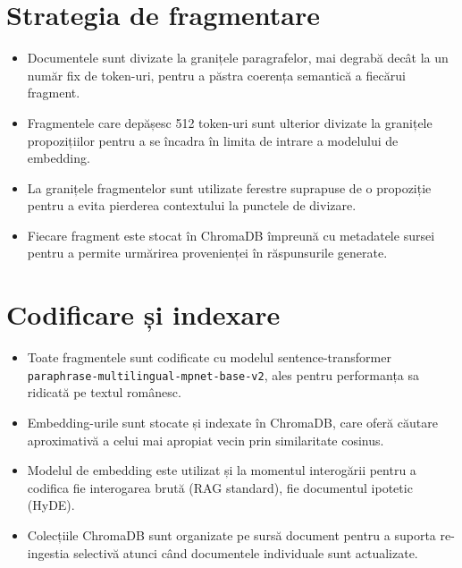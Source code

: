 \documentclass[12pt,a4paper]{report}
\begin{document}
\section{Strategia de fragmentare}
\begin{itemize}
    \item Documentele sunt divizate la granițele paragrafelor, mai degrabă decât la un număr fix de token-uri, pentru a păstra coerența semantică a fiecărui fragment.
    \item Fragmentele care depășesc 512 token-uri sunt ulterior divizate la granițele propozițiilor pentru a se încadra în limita de intrare a modelului de embedding.
    \item La granițele fragmentelor sunt utilizate ferestre suprapuse de o propoziție pentru a evita pierderea contextului la punctele de divizare.
    \item Fiecare fragment este stocat în ChromaDB împreună cu metadatele sursei pentru a permite urmărirea provenienței în răspunsurile generate.
\end{itemize}

\section{Codificare și indexare}
\begin{itemize}
    \item Toate fragmentele sunt codificate cu modelul sentence-transformer \texttt{paraphrase-multilingual-mpnet-base-v2}, ales pentru performanța sa ridicată pe textul românesc.
    \item Embedding-urile sunt stocate și indexate în ChromaDB, care oferă căutare aproximativă a celui mai apropiat vecin prin similaritate cosinus.
    \item Modelul de embedding este utilizat și la momentul interogării pentru a codifica fie interogarea brută (RAG standard), fie documentul ipotetic (HyDE).
    \item Colecțiile ChromaDB sunt organizate pe sursă document pentru a suporta re-ingestia selectivă atunci când documentele individuale sunt actualizate.
\end{itemize}
\end{document}
